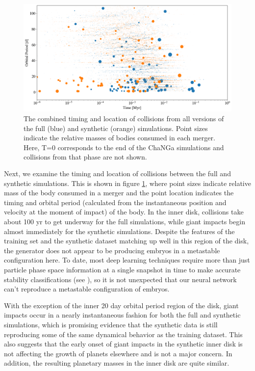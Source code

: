 \begin{figure}
\begin{center}
    \includegraphics[width=\textwidth]{figures/stip/full_coll_syn_comp.png}
    \caption{The combined timing and location of collisions from all versions of the full (blue) and synthetic (orange) simulations. Point sizes indicate the relative masses of bodies consumed in each merger. Here, T=0 corresponds to the end of the {\sc ChaNGa} simulations and collisions from that phase are not shown.\label{fig:full_coll_syn_comp}}
\end{center}
\end{figure}

Next, we examine the timing and location of collisions between the full and synthetic simulations. This is shown in figure \ref{fig:full_coll_syn_comp}, where point sizes indicate relative mass of the body consumed in a merger and the point location indicates the timing and orbital period (calculated from the instantaneous position and velocity at the moment of impact) of the body. In the inner disk, collisions take about 100 yr to get underway for the full simulations, while giant impacts begin almost immediately for the synthetic simulations. Despite the features of the training set and the synthetic dataset matching up well in this region of the disk, the generator does not appear to be producing embryos in a metastable configuration here. To date, most deep learning techniques require more than just particle phase space information at a single snapshot in time to make accurate stability classifications (see \cite{tamayo20, cranmer21}), so it is not unexpected that our neural network can't reproduce a metastable configuration of embryos.

With the exception of the inner 20 day orbital period region of the disk, giant impacts occur in a nearly instantaneous fashion for both the full and synthetic simulations, which is promising evidence that the synthetic data is still reproducing some of the same dynamical behavior as the training dataset. This also suggests that the early onset of giant impacts in the synthetic inner disk is not affecting the growth of planets elsewhere and is not a major concern. In addition, the resulting planetary masses in the inner disk are quite similar.

